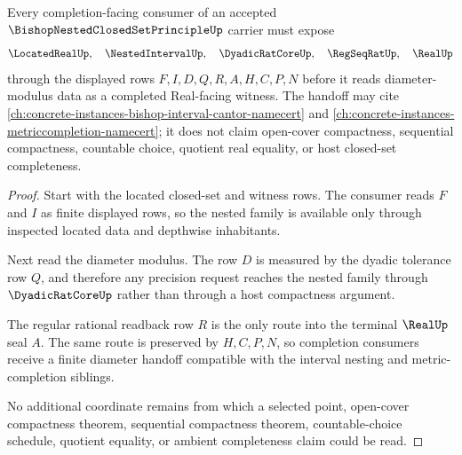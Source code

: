 \begin{theorem}
\label{thm:bishop-nested-closed-set-diameter-handoff}
Every completion-facing consumer of an accepted $\BishopNestedClosedSetPrincipleUp$ carrier must expose
$$
\LocatedRealUp,\quad \NestedIntervalUp,\quad \DyadicRatCoreUp,\quad \RegSeqRatUp,\quad \RealUp
$$
through the displayed rows $F,I,D,Q,R,A,H,C,P,N$ before it reads diameter-modulus data as a completed Real-facing witness. The handoff may cite \autoref{ch:concrete-instances-bishop-interval-cantor-namecert} and \autoref{ch:concrete-instances-metriccompletion-namecert}; it does not claim open-cover compactness, sequential compactness, countable choice, quotient real equality, or host closed-set completeness.
\end{theorem}
\begin{proof}
Start with the located closed-set and witness rows. The consumer reads $F$ and $I$ as finite displayed rows, so the nested family is available only through inspected located data and depthwise inhabitants.

Next read the diameter modulus. The row $D$ is measured by the dyadic tolerance row $Q$, and therefore any precision request reaches the nested family through $\DyadicRatCoreUp$ rather than through a host compactness argument.

The regular rational readback row $R$ is the only route into the terminal $\RealUp$ seal $A$. The same route is preserved by $H,C,P,N$, so completion consumers receive a finite diameter handoff compatible with the interval nesting and metric-completion siblings.

No additional coordinate remains from which a selected point, open-cover compactness theorem, sequential compactness theorem, countable-choice schedule, quotient equality, or ambient completeness claim could be read.
\end{proof}


